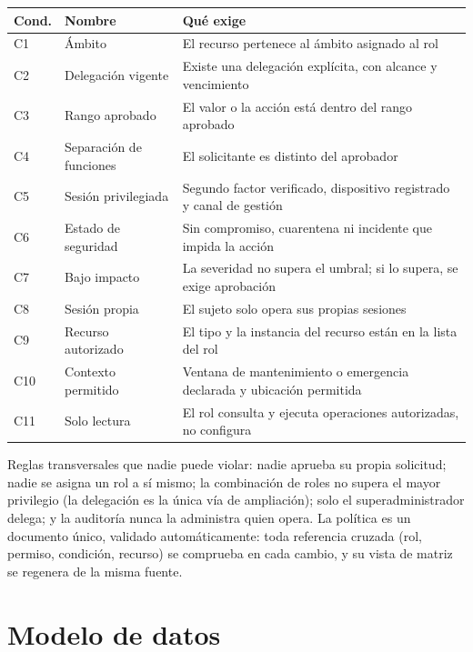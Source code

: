 \documentclass[11pt,a4paper]{article}
\begin{document}
\begin{longtable}{p{1.6cm}p{4.6cm}p{7.8cm}}
\toprule
\textbf{Cond.} & \textbf{Nombre} & \textbf{Qué exige}\\
\midrule
C1 & Ámbito & El recurso pertenece al ámbito asignado al rol\\
C2 & Delegación vigente & Existe una delegación explícita, con alcance y vencimiento\\
C3 & Rango aprobado & El valor o la acción está dentro del rango aprobado\\
C4 & Separación de funciones & El solicitante es distinto del aprobador\\
C5 & Sesión privilegiada & Segundo factor verificado, dispositivo registrado y canal de gestión\\
C6 & Estado de seguridad & Sin compromiso, cuarentena ni incidente que impida la acción\\
C7 & Bajo impacto & La severidad no supera el umbral; si lo supera, se exige aprobación\\
C8 & Sesión propia & El sujeto solo opera sus propias sesiones\\
C9 & Recurso autorizado & El tipo y la instancia del recurso están en la lista del rol\\
C10 & Contexto permitido & Ventana de mantenimiento o emergencia declarada y ubicación permitida\\
C11 & Solo lectura & El rol consulta y ejecuta operaciones autorizadas, no configura\\
\bottomrule
\end{longtable}

Reglas transversales que nadie puede violar: nadie aprueba su propia solicitud; nadie se asigna un rol a sí mismo; la combinación de roles no supera el mayor privilegio (la delegación es la única vía de ampliación); solo el superadministrador delega; y la auditoría nunca la administra quien opera. La política es un documento único, validado automáticamente: toda referencia cruzada (rol, permiso, condición, recurso) se comprueba en cada cambio, y su vista de matriz se regenera de la misma fuente.

\section{Modelo de datos}
\end{document}
